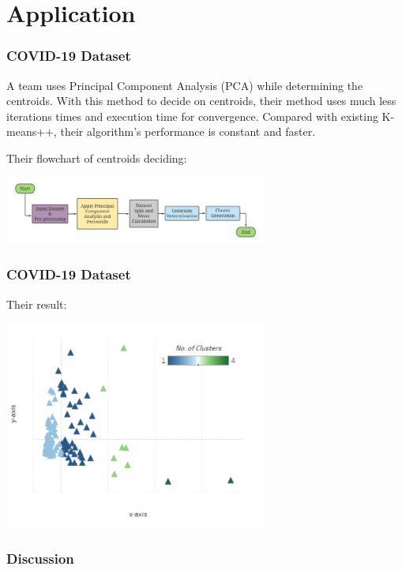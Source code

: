 \documentclass[9pt]{beamer}
\begin{document}
\section{Application}
\begin{frame}
	\frametitle{COVID-19 Dataset}
A team uses Principal Component Analysis (PCA)  while determining the centroids. With this method to decide on centroids, their method uses much less iterations times and execution time for convergence. Compared with existing K-means++, their algorithm's performance is constant and faster. \par
Their flowchart of centroids deciding:
\centerline{\includegraphics[width=0.65\textwidth]{figures/COVID19.png}}



\end{frame}


\begin{frame}
	\frametitle{COVID-19 Dataset}
Their result:
\centerline{\includegraphics[width=0.65\textwidth]{figures/covidResult.png}}
\end{frame}

\begin{frame}
	\frametitle{Discussion}

\end{frame}
\end{document}
